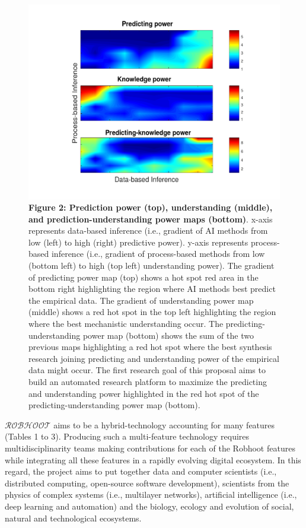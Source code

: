 \documentclass[12pt, a4paper]{article} %
\begin{document}
\begin{figure}
\hspace{-0.2 in}\includegraphics[width=1\textwidth]{Figures/Figure3.pdf}
{\small {\bf Figure 2: Prediction power (top), understanding (middle),
    and prediction-understanding power maps (bottom)}. x-axis
  represents data-based inference (i.e., gradient of AI methods from
  low (left) to high (right) predictive power). y-axis represents
  process-based inference (i.e., gradient of process-based methods
  from low (bottom left) to high (top left) understanding power). The
  gradient of predicting power map (top) shows a hot spot red area in
  the bottom right highlighting the region where AI methods best
  predict the empirical data. The gradient of understanding power map
  (middle) shows a red hot spot in the top left highlighting the
  region where the best mechanistic understanding occur. The
  predicting-understanding power map (bottom) shows the sum of the two
  previous maps highlighting a red hot spot where the best synthesis
  research joining predicting and understanding power of the empirical
  data might occur. The first research goal of this proposal aims to
  build an automated research platform to maximize the predicting and
  understanding power highlighted in the red hot spot of the
  predicting-understanding power map (bottom).}
\end{figure}
  
{\bf $\mathcal{ROBHOOT}$} aims to be a hybrid-technology
accounting for many features (Tables 1 to 3). Producing such a
multi-feature technology requires multidisciplinarity teams making
contributions for each of the Robhoot features while integrating all
these features in a rapidly evolving digital ecosystem. In this
regard, the project aims to put together data and computer scientists
(i.e., distributed computing, open-source software development),
scientists from the physics of complex systems (i.e., multilayer
networks), artificial intelligence (i.e., deep learning and
automation) and the biology, ecology and evolution of social, natural
and technological ecosystems.
\end{document}
